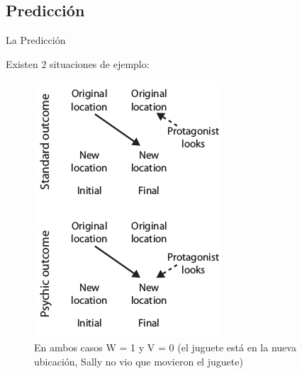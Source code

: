 \documentclass{beamer}
\begin{document}
\subsection{Predicción}
\begin{frame}{La Predicción}

Existen 2 situaciones de ejemplo:

\begin{figure}
\includegraphics[height=0.65\textheight]{imagenes/situaciones.jpg}
\caption{En ambos casos W = 1 y V = 0 (el juguete está en la nueva ubicación, Sally no vio que movieron el juguete)}
\label{outcome}
\end{figure}

\end{frame}
\end{document}
